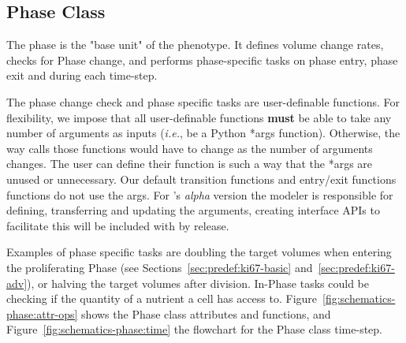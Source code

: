 

\subsection{Phase Class}\label{sec:meth:phase}
The phase is the "base unit" of the phenotype. It defines volume change rates, checks for Phase change, and performs phase-specific tasks on phase entry, phase exit and during each time-step.

The phase change check and phase specific tasks are user-definable functions. For flexibility, we impose that all user-definable functions \textbf{must} be able to take any number of arguments as inputs (\textit{i.e.}, be a Python *args function). Otherwise, the way \pcp\space calls those functions would have to change as the number of arguments changes. The user can define their function is such a way that the *args are unused or unnecessary. Our default transition functions and entry/exit functions functions do not use the args. For \pcp's \textit{alpha} version the modeler is responsible for defining, transferring and updating the arguments, creating interface APIs to facilitate this will be included with \pcps by release.

Examples of phase specific tasks are doubling the target volumes when entering the proliferating Phase (see Sections~\ref{sec:predef:ki67-basic} and~\ref{sec:predef:ki67-adv}), or halving the target volumes after division. In-Phase tasks could be checking if the quantity of a nutrient a cell has access to. Figure~\ref{fig:schematics-phase:attr-ops} shows the Phase class attributes and functions, and Figure~\ref{fig:schematics-phase:time} the flowchart for the Phase class time-step.

